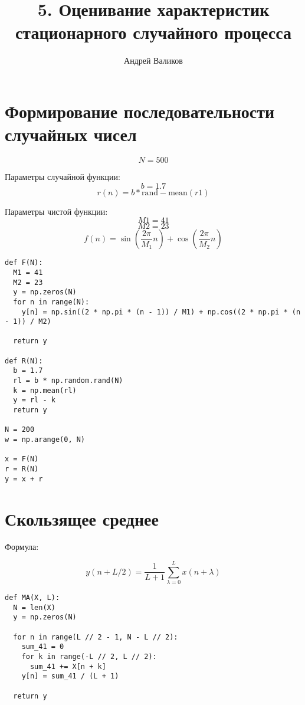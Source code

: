 \documentclass[12pt]{article}
\begin{document}
\title{5. Оценивание характеристик стационарного случайного процесса}
\author{Андрей Валиков}
\date{}
\maketitle
																																																								\section{Формирование последовательности случайных чисел}
		   																																																						
\[N = 500\]  
	
	  
Параметры случайной функции:
\[b = 1.7\]
\[r(n)= b * \textrm{rand} - \textrm{mean}(r1)\]	


Параметры чистой функции:
\[M1 = 41\]
\[M2 = 23\]
\[f(n)=\sin\left(\frac{2\pi}{M_1}n\right) + \cos\left(\frac{2\pi}{M_2}n\right)\]



\begin{lstlisting}
def F(N):
  M1 = 41
  M2 = 23
  y = np.zeros(N)
  for n in range(N):
    y[n] = np.sin((2 * np.pi * (n - 1)) / M1) + np.cos((2 * np.pi * (n - 1)) / M2)

  return y
  
def R(N):
  b = 1.7
  rl = b * np.random.rand(N)
  k = np.mean(rl)
  y = rl - k
  return y

N = 200
w = np.arange(0, N)

x = F(N)
r = R(N)
y = x + r
\end{lstlisting}

\begin{figure}[!htb]
\centering
\caption{}
\label{}
\end{figure}


\section{Скользящее среднее}
Формула:

\[y(n + L / 2) = \frac{1}{L + 1}\sum_{\lambda=0}^{L}x(n+\lambda) \]
 


\begin{lstlisting}
def MA(X, L):
  N = len(X)
  y = np.zeros(N)

  for n in range(L // 2 - 1, N - L // 2):
    sum_41 = 0
    for k in range(-L // 2, L // 2):
      sum_41 += X[n + k]
    y[n] = sum_41 / (L + 1)

  return y
\end{lstlisting}
\end{document}
